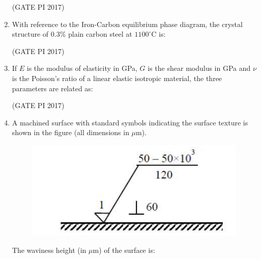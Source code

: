 \documentclass[journal,12pt,onecolumn]{IEEEtran}
\theoremstyle{remark}
\begin{document}
\begin{enumerate}
\hfill (GATE PI 2017)

\item With reference to the Iron\--Carbon equilibrium phase diagram, the crystal structure of $0.3\%$ plain carbon steel at $1100^\circ$C is:
\begin{enumerate}
\end{enumerate}

\hfill (GATE PI 2017)

\item If $E$ is the modulus of elasticity in GPa, $G$ is the shear modulus in GPa and $\nu$ is the Poisson's ratio of a linear elastic isotropic material, the three parameters are related as:
\begin{enumerate}
\end{enumerate}

\hfill (GATE PI 2017)

\item A machined surface with standard symbols indicating the surface texture is shown in the figure (all dimensions in $\mu$m).  

\begin{figure}[h]
    \centering
    \includegraphics[width=0.5\columnwidth]{fig3.png}
    \caption{}
    \label{fig:placeholder}
\end{figure}

The waviness height (in $\mu$m) of the surface is:
\begin{enumerate}
\end{enumerate}


\end{enumerate}
\end{document}
